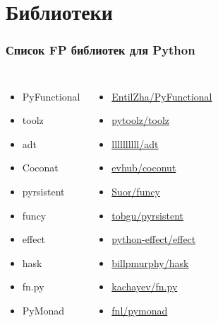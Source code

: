 \documentclass[18pt, compress, aspectratio=169]{beamer}
\begin{document}

\section{Библиотеки}

\fontsize{15pt}{16}\selectfont
\begin{frame}
    \frametitle{Список FP библиотек для Python}
    \vspace{-35pt}
    \begin{columns}[T,onlytextwidth]
        \begin{itemize}[label={\MVRightarrow}]
            \item PyFunctional
            \item toolz
            \item adt
            \item Coconat
            \item pyrsistent
            \item funcy
            \item effect
            \item hask
            \item fn.py
            \item PyMonad
        \end{itemize}

        \begin{itemize}[label={}]
            \item \href{github.com/EntilZha/PyFunctional}{EntilZha/PyFunctional}
            \item \href{github.com/pytoolz/toolz}{pytoolz/toolz}
            \item \href{github.com/llllllllll/adt}{llllllllll/adt}
            \item \href{github.com/evhub/coconut}{evhub/coconut}
            \item \href{github.com/Suor/funcy}{Suor/funcy}
            \item \href{github.com/tobgu/pyrsistent}{tobgu/pyrsistent}
            \item \href{github.com/python-effect/effect}{python-effect/effect}
            \item \href{github.com/billpmurphy/hask}{billpmurphy/hask}
            \item \href{github.com/kachayev/fn.py}{kachayev/fn.py}
            \item \href{github.com/fnl/pymonad}{fnl/pymonad}
        \end{itemize}

    \end{columns}
\end{frame}
\fontsize{19pt}{20}\selectfont
\end{document}
